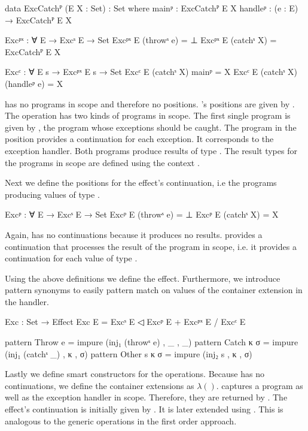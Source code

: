 \begin{code}
data ExcCatchᴾ (E X : Set) : Set where
  mainᵖ    : ExcCatchᴾ E X
  handleᵖ  : (e : E) → ExcCatchᴾ E X

Excᵖˣ : ∀ E → Excˢ E → Set
Excᵖˣ E (throwˢ e)  = ⊥
Excᵖˣ E (catchˢ X)  = ExcCatchᴾ E X

Excᶜ : ∀ E s → Excᵖˣ E s → Set
Excᶜ E (catchˢ X) mainᵖ        = X
Excᶜ E (catchˢ X) (handleᵖ e)  = X
\end{code}
 has no programs in scope and therefore no positions.
's positions are given by .
The operation has two kinds of programs in scope.
The first single program is given by , the
program whose exceptions should be caught.
The program in the  position provides a
continuation for each exception.
It corresponds to the exception handler.
Both programs produce results of type .
The result types for the programs in scope are defined using the context
.

Next we define the positions for the effect's continuation, i.e the programs
producing values of type .

\begin{code}
Excᵖ : ∀ E → Excˢ E → Set
Excᵖ E (throwˢ e)  = ⊥
Excᵖ E (catchˢ X)  = X
\end{code}
Again,  has no continuations because it produces no
results.
 provides a continuation that processes the result of the
program in scope, i.e. it provides a continuation for each value of type
.

Using the above definitions we define the  effect.
Furthermore, we introduce pattern synonyms to easily pattern match on values of
the container extension in the handler.
\begin{code}
Exc : Set → Effect
Exc E = Excˢ E ◁ Excᵖ E + Excᵖˣ E / Excᶜ E

pattern Throw e      = impure (inj₁ (throwˢ e)  , _ ,  _)
pattern Catch κ σ    = impure (inj₁ (catchˢ _)  , κ ,  σ)
pattern Other s κ σ  = impure (inj₂ s           , κ ,  σ)
\end{code}
Lastly we define smart constructors for the operations.
Because  has no continuations, we define the container
extensions as $\lambda ()$.
 captures a program  as well as the
exception handler in scope.
Therefore, they are returned by .
The effect's continuation  is initially given by
.
It is later extended using \AgdaFunction{>>=}.
This is analogous to the generic operations in the first order approach.

